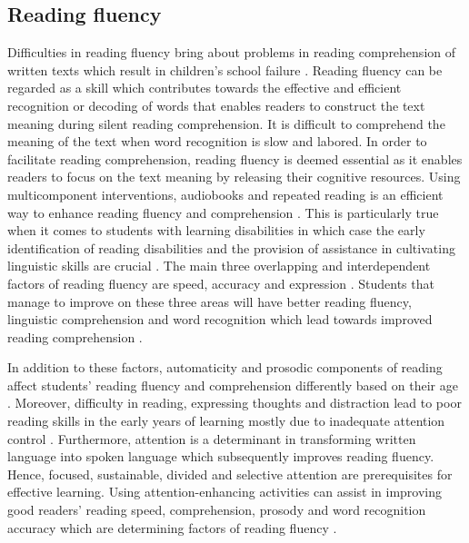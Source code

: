\documentclass[english]{textolivre}
\begin{document}
\subsection{Reading fluency}
Difficulties in reading fluency bring about problems in reading comprehension of written texts which result in children’s school failure \cite{alvarez-canizo_reading_2020}. Reading fluency can be regarded as a skill which contributes towards the effective and efficient recognition or decoding of words that enables readers to construct the text meaning during silent reading comprehension. It is difficult to comprehend the meaning of the text when word recognition is slow and labored. In order to facilitate reading comprehension, reading fluency is deemed essential as it enables readers to focus on the text meaning by releasing their cognitive resources. Using multicomponent interventions, audiobooks and repeated reading is an efficient way to enhance reading fluency and comprehension \cite{stevens_effects_2017}. This is particularly true when it comes to students with learning disabilities in which case the early identification of reading disabilities and the provision of assistance in cultivating linguistic skills are crucial \cite{catts_early_2016}. The main three overlapping and interdependent factors of reading fluency are speed, accuracy and expression \cite{national2000teaching}. Students that manage to improve on these three areas will have better reading fluency, linguistic comprehension and word recognition which lead towards improved reading comprehension \cite{kim_text_2015}.

In addition to these factors, automaticity and prosodic components of reading affect students’ reading fluency and comprehension differently based on their age \cite{calet_cross-sectional_2015}. Moreover, difficulty in reading, expressing thoughts and distraction lead to poor reading skills in the early years of learning mostly due to inadequate attention control \cite{arrington_contribution_2014}. Furthermore, attention is a determinant in transforming written language into spoken language which subsequently improves reading fluency. Hence, focused, sustainable, divided and selective attention are prerequisites for effective learning. Using attention-enhancing activities can assist in improving good readers’ reading speed, comprehension, prosody and word recognition accuracy which are determining factors of reading fluency \cite{yildiz_relationship_2017}.
\end{document}
